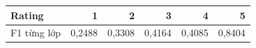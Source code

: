 \begin{tabular}{lrrrrr}
\toprule
Rating & 1 & 2 & 3 & 4 & 5 \\
\midrule
F1 từng lớp & 0{,}2488 & 0{,}3308 & 0{,}4164 & 0{,}4085 & 0{,}8404 \\
\bottomrule
\end{tabular}
